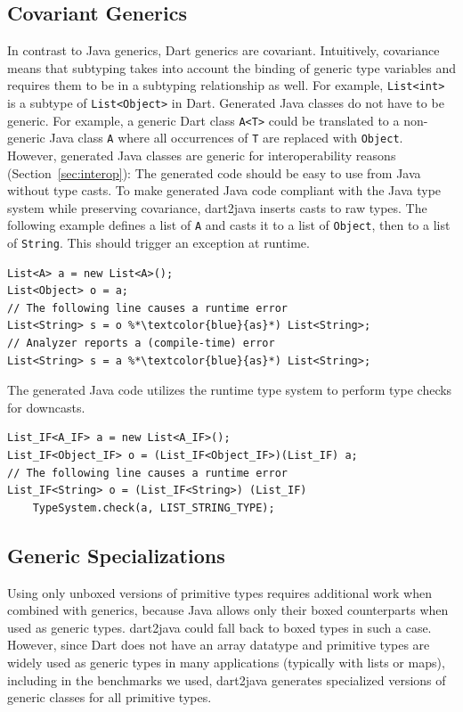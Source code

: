 \documentclass[sigplan,9pt]{acmart}
\begin{document}
\subsection{Covariant Generics}
In contrast to Java generics, Dart generics are covariant. Intuitively, covariance~\cite{Castagna:1995:CCC:203095.203096} means that subtyping takes into account the binding of generic type variables and requires them to be in a subtyping relationship as well. For example, \texttt{List<int>} is a subtype of \texttt{List<Object>} in Dart. Generated Java classes do not have to be generic. For example, a generic Dart class \texttt{A<T>} could be translated to a non-generic Java class \texttt{A} where all occurrences of \texttt{T} are replaced with \texttt{Object}. However, generated Java classes are generic for interoperability reasons (Section~\ref{sec:interop}): The generated code should be easy to use from Java without type casts. To make generated Java code compliant with the Java type system while preserving covariance, dart2java inserts casts to raw types. The following example defines a list of \texttt{A} and casts it to a list of \texttt{Object}, then to a list of \texttt{String}. This should trigger an exception at runtime.
\begin{lstlisting}
List<A> a = new List<A>();
List<Object> o = a;
// The following line causes a runtime error
List<String> s = o %*\textcolor{blue}{as}*) List<String>;
// Analyzer reports a (compile-time) error
List<String> s = a %*\textcolor{blue}{as}*) List<String>;
\end{lstlisting}
The generated Java code utilizes the runtime type system to perform type checks for downcasts.
\begin{lstlisting}
List_IF<A_IF> a = new List<A_IF>();
List_IF<Object_IF> o = (List_IF<Object_IF>)(List_IF) a;
// The following line causes a runtime error
List_IF<String> o = (List_IF<String>) (List_IF) 
    TypeSystem.check(a, LIST_STRING_TYPE);
\end{lstlisting}

\subsection{Generic Specializations}
\label{sec:generic_spec}
Using only unboxed versions of primitive types requires additional work when combined with generics, because Java allows only their boxed counterparts when used as generic types. dart2java could fall back to boxed types in such a case. However, since Dart does not have an array datatype and primitive types are widely used as generic types in many applications (typically with lists or maps), including in the benchmarks we used, dart2java generates specialized versions of generic classes for all primitive types.
\end{document}
